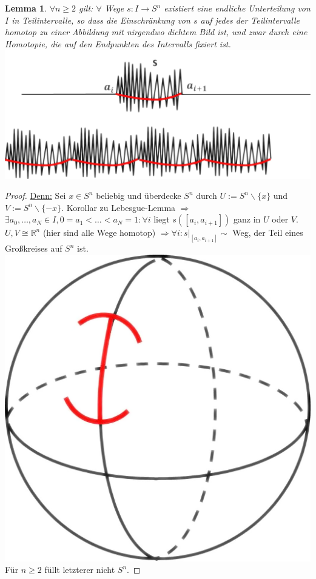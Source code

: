 \documentclass[a4paper,11pt,notitlepage]{report}
\newtheorem{lemma}{Lemma}[chapter]
\theoremstyle{definition}
\newcommand{\R}{{\ensuremath{\mathbb{R}}}}
\begin{document}
\begin{lemma}{}
	$\forall n \geq 2$ gilt: $\forall$ Wege $s \colon I \rightarrow S^n$ existiert eine endliche Unterteilung von $I$ in Teilintervalle, so dass die Einschränkung von $s$ auf jedes der Teilintervalle homotop zu einer Abbildung mit nirgendwo dichtem Bild ist, und zwar durch eine Homotopie, die auf den Endpunkten des Intervalls fixiert ist. \newline \includegraphics[scale=0.4]{images/glaetten.png}
	\end{lemma}
	\begin{proof}
	\underline{Denn:} Sei $x \in S^n$ beliebig und überdecke $S^n$ durch $U:= S^n \backslash \{x\}$ und $V:= S^n \backslash \{-x\}$. Korollar zu Lebesgue-Lemma $\Rightarrow$ $\exists a_0, \ldots, a_N \in I, 0 = a_1 < \ldots < a_N = 1 \colon \forall i$ liegt $s([a_i, a_{i+1}])$ ganz in $U$ oder $V$.
	\newline
	$U,V \cong \R^n$ (hier sind alle Wege homotop) $\Rightarrow \forall i \colon s \big |_{[a_i, a_{i+1}]} \sim$ Weg, der Teil eines Großkreises auf $S^n$ ist. \newline \includegraphics[scale=0.4]{images/Grosskreis.png} \newline
	Für $n\geq 2$ füllt letzterer nicht $S^n$.
\end{proof}
\end{document}
